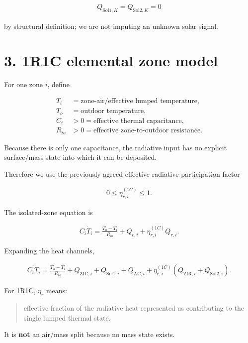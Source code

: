 \documentclass[11pt]{article}
\begin{document}
\begin{align}
Q_{\mathrm{Sol1},K}=Q_{\mathrm{Sol2},K}=0
\end{align}

by structural definition; we are not imputing an unknown solar signal.

\section*{3. 1R1C elemental zone model}

For one zone \(i\), define

\begin{align}
T_i &= \text{zone-air/effective lumped temperature},\\
T_o &= \text{outdoor temperature},\\
C_i &>0=\text{effective thermal capacitance},\\
R_{io} &>0=\text{effective zone-to-outdoor resistance}.
\end{align}

Because there is only one capacitance, the radiative input has no explicit surface/mass state into which it can be deposited.

Therefore we use the previously agreed effective radiative participation factor

\begin{align}
\boxed{
0\le \eta_{r,i}^{(1C)}\le1.
}
\end{align}

The isolated-zone equation is

\begin{align}
\boxed{
C_i\dot T_i
=
\frac{T_o-T_i}{R_{io}}
+
Q_{c,i}
+
\eta_{r,i}^{(1C)}Q_{r,i}.
}
\tag{1}
\end{align}

Expanding the heat channels,

\begin{align}
\boxed{
C_i\dot T_i
=
\frac{T_o-T_i}{R_{io}}
+
Q_{\mathrm{ZIC},i}
+
Q_{\mathrm{Sol1},i}
+
Q_{\mathrm{AC},i}
+
\eta_{r,i}^{(1C)}
\left(
Q_{\mathrm{ZIR},i}
+
Q_{\mathrm{Sol2},i}
\right).
}
\tag{2}
\end{align}

For 1R1C, \(\eta_r\) means:

\begin{quote}
effective fraction of the radiative heat represented as contributing to the single lumped thermal state.
\end{quote}

It is \textbf{not} an air/mass split because no mass state exists.
\end{document}
